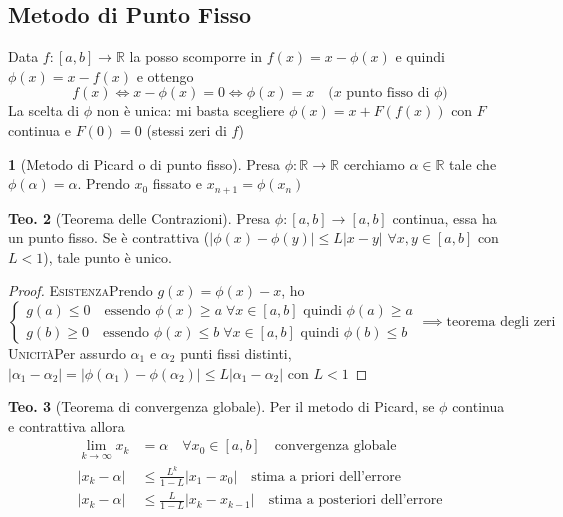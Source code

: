 \documentclass[a4paper,10pt]{article}
\theoremstyle{definition}
\newcommand{\noun}[1]{\textsc{#1}}
\newcommand{\re}{\mathbb{R}} %
\theoremstyle{indentdefinition}
\theoremstyle{indenttheorem}
\newtheorem{thm}{Teo.}
\theoremstyle{myremark}
\theoremstyle{indentgeneral}
\newtheorem{lyxalgorithm}[thm]{\protect\algorithmname}
\theoremstyle{plain}
\theoremstyle{plain}
\newenvironment{myboxed} 
{\noindent\begin{lrbox}{\mybox}\begin{minipage}{\textwidth}}
{\end{minipage}\end{lrbox}\fbox{\usebox{\mybox}}}
\begin{document}
\subsection{Metodo di Punto Fisso}
Data $f:[a,b]\to\re$ la posso scomporre in $f(x)=x-\phi(x)$ e quindi $\phi(x)=x-f(x)$ e ottengo
$$f(x)\iff x-\phi(x)=0\iff \phi(x)=x \quad \text{($x$ punto fisso di $\phi$)}$$
La scelta di $\phi$ non è unica: mi basta scegliere $\phi(x)=x+F(f(x))$ con $F$ continua e $F(0)=0$ (stessi zeri di $f$)
\begin{lyxalgorithm}[Metodo di Picard o di punto fisso]
Presa $\phi\colon\mathbb{R}\rightarrow\mathbb{R}$ cerchiamo $\alpha\in\mathbb{R}$
tale che $\phi\left(\alpha\right)=\alpha$. Prendo $x_{0}$ fissato
e $x_{n+1}=\phi\left(x_{n}\right)$
\end{lyxalgorithm}

\begin{thm}[Teorema delle Contrazioni]
Presa $\phi\colon\left[a,b\right]\rightarrow\left[a,b\right]$
continua, essa ha un punto fisso. Se è contrattiva ($\left|\phi\left(x\right)-\phi\left(y\right)\right|\leq L\left|x-y\right|$ $\forall x,y\in[a,b]$
con $L<1$), tale punto è unico.
\end{thm}

\begin{proof}
\noun{Esistenza}\quad{}Prendo $g\left(x\right)=\phi\left(x\right)-x$,
ho $$\begin{cases}
    g\left(a\right)\leq0 \quad \text{essendo } \phi(x)\ge a \;\forall x\in[a,b] \text{ quindi } \phi(a)\ge a\\
    g\left(b\right)\geq0 \quad \text{essendo } \phi(x)\le b \;\forall x\in[a,b] \text{ quindi } \phi(b)\le b
\end{cases}\implies\text{teorema degli
zeri}$$ 
\noun{Unicità}\quad{}Per assurdo $\alpha_{1}$ e $\alpha_{2}$ punti
fissi distinti, $\left|\alpha_{1}-\alpha_{2}\right|=\left|\phi\left(\alpha_{1}\right)-\phi\left(\alpha_{2}\right)\right|\leq L\left|\alpha_{1}-\alpha_{2}\right|$
con $L<1$
\end{proof}

\begin{myboxed}
\begin{thm}[Teorema di convergenza globale]
Per il metodo di Picard, se $\phi$ continua e contrattiva allora
\begin{align*}
    \lim_{k\to\infty}x_k&=\alpha\quad \forall x_0\in[a,b] \quad \text{convergenza globale}\\
    \left|x_{k}-\alpha\right|&\leq\frac{L^{k}}{1-L}\left|x_{1}-x_{0}\right| \quad\text{stima a priori dell'errore}\\
    \left|x_{k}-\alpha\right|&\leq\frac{L}{1-L}\left|x_{k}-x_{k-1}\right| \quad\text{stima a posteriori dell'errore}
\end{align*}
\end{thm}
\end{myboxed}
\end{document}
